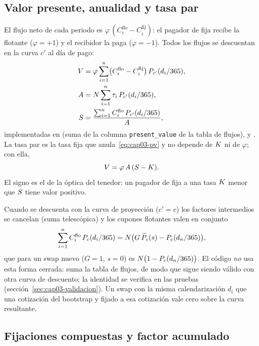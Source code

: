 \subsection{Valor presente, anualidad y tasa par}\label{sec:cap03-valor}

El flujo neto de cada periodo es $\varphi\,(C^{\mathrm{flo}}_i-C^{\mathrm{fij}}_i)$: el pagador de fija recibe la
flotante ($\varphi=+1$) y el recibidor la paga ($\varphi=-1$). Todos los flujos se descuentan en la curva
$c'$ al día de pago:
\begin{align}
  V &= \varphi\sum_{i=1}^{n}\bigl(C^{\mathrm{flo}}_i-C^{\mathrm{fij}}_i\bigr)\,P_{c'}(d_i/365),
  \label{eq:cap03-pv}\\
  A &= N\sum_{i=1}^{n}\tau_i\,P_{c'}(d_i/365),
  \label{eq:cap03-anualidad}\\
  S &= \frac{\sum_{i=1}^{n}C^{\mathrm{flo}}_i\,P_{c'}(d_i/365)}{A},
  \label{eq:cap03-tasa-par}
\end{align}
implementadas en  (suma de la columna
\texttt{present\_value} de la tabla de flujos),  y
. La tasa par es la tasa fija que anula~\eqref{eq:cap03-pv}
y no depende de $K$ ni de $\varphi$; con ella,
\begin{equation}\label{eq:cap03-pv-par}
  V=\varphi\,A\,(S-K).
\end{equation}
El signo es el de la óptica del tenedor: un pagador de fija a una tasa $K$ menor que $S$ tiene valor
positivo.

Cuando se descuenta con la curva de proyección ($c'=c$) los factores intermedios se cancelan
(suma telescópica) y los cupones flotantes valen en conjunto
\begin{equation}\label{eq:cap03-telescopica}
  \sum_{i=1}^{n}C^{\mathrm{flo}}_i\,P_{c}(d_i/365)=N\bigl(G\,\widetilde P_c(s)-P_{c}(d_n/365)\bigr),
\end{equation}
que para un swap nuevo ($G=1$, $s=0$) es $N\bigl(1-P_{c}(d_n/365)\bigr)$.
El código \emph{no} usa esta forma cerrada: suma la tabla de flujos, de modo que sigue siendo válido con otra
curva de descuento; la identidad se verifica en las pruebas (sección~\ref{sec:cap03-validacion}). Un swap con la
misma calendarización $d_i$ que una cotización del bootstrap y fijado a esa cotización vale cero sobre la curva
resultante.

\subsection{Fijaciones compuestas y factor acumulado}\label{sec:cap03-fijaciones}

